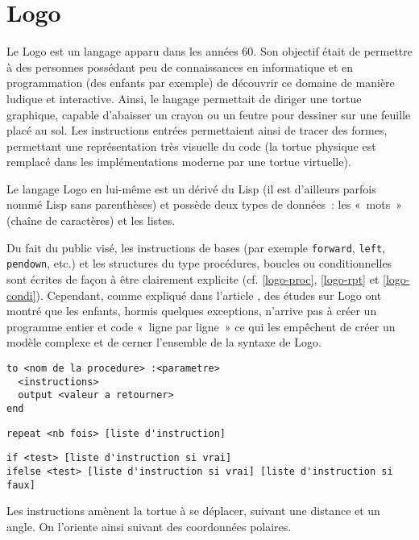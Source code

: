 \section{Logo}
\label{Logo}

Le Logo est un langage apparu dans les années 60. Son objectif était de permettre à des personnes possédant peu de connaissances en informatique et en programmation (des enfants par exemple) de découvrir ce domaine de manière ludique et interactive. Ainsi, le langage permettait de diriger une tortue graphique, capable d'abaisser un crayon ou un feutre pour dessiner sur une feuille placé au sol. Les instructions entrées permettaient ainsi de tracer des formes, permettant une représentation très visuelle du code (la tortue physique est remplacé dans les implémentations moderne par une tortue virtuelle).

Le langage Logo en lui-même est un dérivé du Lisp (il est d'ailleurs parfois nommé Lisp sans parenthèses) et possède deux types de données~: les «~mots~» (chaîne de caractères) et les listes.

Du fait du public visé, les instructions de bases (par exemple \verb|forward|, \verb|left|, \verb|pendown|, etc.) et les structures du type procédures, boucles ou conditionnelles sont écrites de façon à être clairement explicite (cf. \ref{logo-proc}, \ref{logo-rpt} et \ref{logo-condi}).
Cependant, comme expliqué dans l'article \cite{Logo}, des études sur Logo ont montré que les enfants, hormis quelques exceptions, n'arrive pas à créer un programme entier et code «~ligne par ligne~» ce qui les empêchent de créer un modèle complexe et de cerner l'ensemble de la syntaxe de Logo.

\begin{lstlisting}[language=Stibbons,label=logo-proc,caption=Procédure en Logo]
to <nom de la procedure> :<parametre>
  <instructions>
  output <valeur a retourner>
end
\end{lstlisting}

\begin{lstlisting}[language=Stibbons,label=logo-rpt,caption=Boucle en Logo]
repeat <nb fois> [liste d'instruction]
\end{lstlisting}

\begin{lstlisting}[language=Stibbons,label=logo-condi,caption=Conditionnelles en Logo]
if <test> [liste d'instruction si vrai]
ifelse <test> [liste d'instruction si vrai] [liste d'instruction si faux]
\end{lstlisting}

Les instructions amènent la tortue à se déplacer, suivant une distance et un angle. On l'oriente ainsi suivant des coordonnées polaires.

